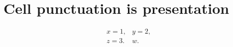 \documentclass{article}
\begin{document}
\section{Cell punctuation is presentation}
\[\begin{array}{ll} x=1, & y=2,\\ z=3. & w.\end{array}\]
\end{document}
